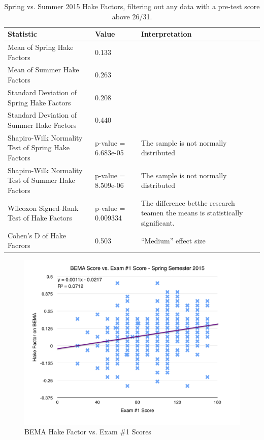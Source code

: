 \begin{landscape}
\begin{table}[!ht]
  \centering
  \begin{tabular}{|l|l|l|}
    \hline
    \textbf{Statistic} & \textbf{Value} & \textbf{Interpretation}\\
	\hline
	Mean of Spring Hake Factors & 0.133 & \\
	\hline
	Mean of Summer Hake Factors & 0.263 & \\
	\hline
	Standard Deviation of Spring Hake Factors & 0.208 & \\
	\hline
	Standard Deviation of Summer Hake Factors & 0.440 & \\
	\hline
	Shapiro-Wilk Normality Test of Spring Hake Factors & p-value = 6.683e-05 & The sample is not normally distributed \\
	\hline
	Shapiro-Wilk Normality Test of Summer Hake Factors & p-value = 8.509e-06 & The sample is not normally distributed \\
	\hline
	Wilcoxon Signed-Rank Test of Hake Factors & p-value = 0.009334 & The difference betthe research teamen the means is statistically significant. \\
	\hline
	Cohen's D of Hake Facrors & 0.503 & ``Medium'' effect size \\
	\hline
  \end{tabular}
  \caption{Spring vs. Summer 2015 Hake Factors, filtering out any data with a pre-test score above 26/31.}
  \label{tab:compareSpSu15}
\end{table}
\end{landscape}

\begin{figure}[!htb]
	\centering
	\includegraphics[width=6in]{img/chapter4/bema_vs_ex1_sp15}
	\caption[BEMA Hake Factor vs. Exam \#1 Scores]{BEMA Hake Factor vs. Exam \#1 Scores}
  \label{fig:bemaVsExOneSp15}
\end{figure}

